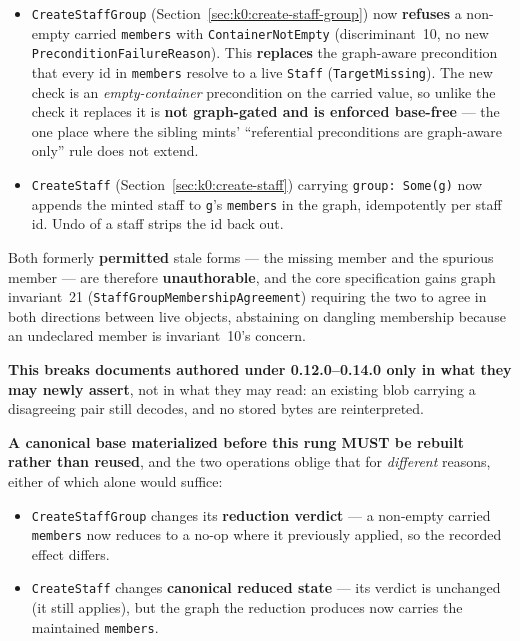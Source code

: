 \documentclass[11pt,letterpaper]{report}
\newcommand{\MUST}{\textbf{MUST}}
\begin{document}
\begin{itemize}[leftmargin=1.2em]
  \item \texttt{CreateStaffGroup} (Section~\ref{sec:k0:create-staff-group})
    now \textbf{refuses} a non-empty carried \texttt{members} with
    \texttt{ContainerNotEmpty} (discriminant~10, no new
    \texttt{PreconditionFailureReason}). This \textbf{replaces} the
    graph-aware precondition that every id in \texttt{members} resolve to a
    live \texttt{Staff} (\texttt{TargetMissing}). The new check is an
    \emph{empty-container} precondition on the carried value, so unlike the
    check it replaces it is \textbf{not graph-gated and is enforced base-free}
    --- the one place where the sibling mints' ``referential preconditions are
    graph-aware only'' rule does not extend.
  \item \texttt{CreateStaff} (Section~\ref{sec:k0:create-staff}) carrying
    \texttt{group: Some(g)} now appends the minted staff to \texttt{g}'s
    \texttt{members} in the graph, idempotently per staff id. Undo of a staff
    strips the id back out.
\end{itemize}

\noindent Both formerly \textbf{permitted} stale forms --- the missing member
and the spurious member --- are therefore \textbf{unauthorable}, and the core
specification gains graph invariant~21
(\texttt{StaffGroupMembershipAgreement}) requiring the two to agree in both
directions between live objects, abstaining on dangling membership because an
undeclared member is invariant~10's concern.

\textbf{This breaks documents authored under 0.12.0--0.14.0 only in what they
may newly assert}, not in what they may read: an existing blob carrying a
disagreeing pair still decodes, and no stored bytes are reinterpreted.

\textbf{A canonical base materialized before this rung \MUST{} be rebuilt rather
than reused}, and the two operations oblige that for \emph{different} reasons,
either of which alone would suffice:

\begin{itemize}[leftmargin=1.2em]
  \item \texttt{CreateStaffGroup} changes its \textbf{reduction verdict} --- a
    non-empty carried \texttt{members} now reduces to a no-op where it
    previously applied, so the recorded effect differs.
  \item \texttt{CreateStaff} changes \textbf{canonical reduced state} --- its
    verdict is unchanged (it still applies), but the graph the reduction
    produces now carries the maintained \texttt{members}.
\end{itemize}
\end{document}
